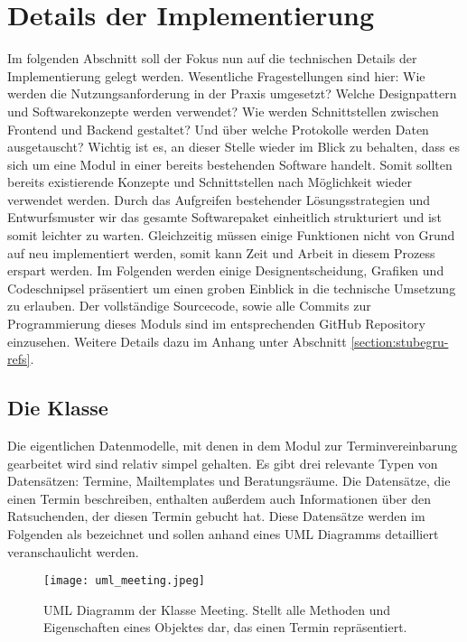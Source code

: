 \section{Details der Implementierung}
Im folgenden Abschnitt soll der Fokus nun auf die technischen Details der
Implementierung gelegt werden. Wesentliche Fragestellungen sind hier: Wie
werden die Nutzungsanforderung in der Praxis umgesetzt? Welche Designpattern
und Softwarekonzepte werden verwendet? Wie werden Schnittstellen zwischen
Frontend und Backend gestaltet? Und über welche Protokolle werden Daten
ausgetauscht? Wichtig ist es, an dieser Stelle wieder im Blick zu behalten,
dass es sich um eine Modul in einer bereits bestehenden Software handelt. Somit
sollten bereits existierende Konzepte und Schnittstellen nach Möglichkeit
wieder verwendet werden. Durch das Aufgreifen bestehender Lösungsstrategien und
Entwurfsmuster wir das gesamte Softwarepaket einheitlich strukturiert und ist
somit leichter zu warten. Gleichzeitig müssen einige Funktionen nicht von Grund
auf neu implementiert werden, somit kann Zeit und Arbeit in diesem Prozess
erspart werden\cite{wiederverwSoftware}. Im Folgenden werden einige
Designentscheidung, Grafiken und Codeschnipsel präsentiert um einen groben
Einblick in die technische Umsetzung zu erlauben. Der vollständige Sourcecode,
sowie alle Commits zur Programmierung dieses Moduls sind im entsprechenden
GitHub Repository einzusehen. Weitere Details dazu im Anhang unter Abschnitt
\ref{section:stubegru-refs}.

\subsection*{Die Klasse }
Die eigentlichen Datenmodelle, mit denen in dem Modul zur Terminvereinbarung
gearbeitet wird sind relativ simpel gehalten. Es gibt drei relevante Typen von
Datensätzen: Termine, Mailtemplates und Beratungsräume. Die Datensätze, die
einen Termin beschreiben, enthalten außerdem auch Informationen über den
Ratsuchenden, der diesen Termin gebucht hat. Diese Datensätze werden im
Folgenden als  bezeichnet und sollen anhand eines \gls{UML}
Diagramms detailliert veranschaulicht werden.

\begin{figure}[H]
    \caption{UML Diagramm der Klasse Meeting. Stellt alle Methoden und Eigenschaften eines Objektes dar, das einen Termin repräsentiert.}
    \centering
    \texttt{[image: uml\_meeting.jpeg]}
\end{figure}

